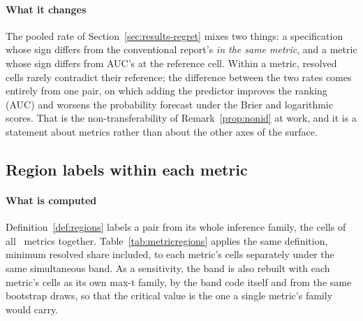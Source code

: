 \paragraph{What it changes}
The pooled rate of Section~\ref{sec:results-regret} mixes two things: a
specification whose sign differs from the conventional report's \emph{in the
same metric}, and a metric whose sign differs from AUC's at the reference
cell. Within a metric, resolved cells rarely contradict their reference; the
difference between the two rates comes entirely from one pair, on which adding
the predictor improves the ranking (AUC) and worsens the probability forecast
under the Brier and logarithmic scores. That is the non-transferability of
Remark~\ref{prop:nonid} at work, and it is a statement about metrics rather
than about the other axes of the surface.

\subsection{Region labels within each metric}
\label{app:ijf-regions}

\paragraph{What is computed}
Definition~\ref{def:regions} labels a pair from its whole inference family,
the cells of all \nInstruments\ metrics together. Table~\ref{tab:metricregions}
applies the same definition, minimum resolved share included, to each
metric's cells separately under the same simultaneous band. As a
sensitivity, the band is also rebuilt with each metric's cells as its own
max-t family, by the band code itself and from the same bootstrap draws, so
that the critical value is the one a single metric's family would carry.



